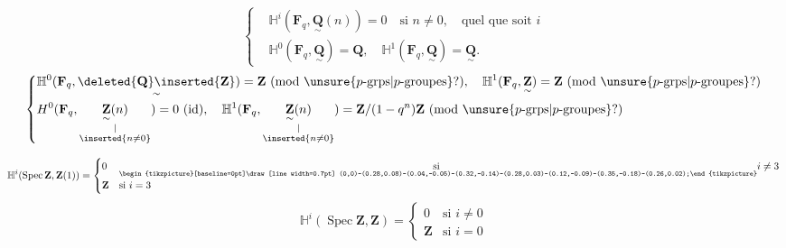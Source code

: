 \[
\left\{\begin{aligned}
&\mathbb H^i(\mathbf F_q,\underset{\sim}{\mathbf Q}(n))=0\quad\text{si }n\neq0,\quad\text{quel que soit }i\\
&\mathbb H^0(\mathbf F_q,\underset{\sim}{\mathbf Q})=\mathbf Q,\quad\mathbb H^1(\mathbf F_q,\underset{\sim}{\mathbf Q})=\underset{\sim}{\mathbf Q}.
\end{aligned}\right.
\]
\[
\left\{\begin{aligned}
&\mathbb H^0(\mathbf F_q,\underset{\sim}{\deleted{\mathbf Q}\inserted{\mathbf Z}})=\mathbf Z\ (\text{mod }\unsure{p\text{-grps}|p\text{-groupes}}?),\quad
\mathbb H^1(\mathbf F_q,\underset{\sim}{\mathbf Z})=\mathbf Z\ (\text{mod }\unsure{p\text{-grps}|p\text{-groupes}}?)\\
&H^0(\mathbf F_q,\underset{\substack{\vert\\\inserted{n\neq0}}}{\underset{\sim}{\mathbf Z}(n)})=0\ (\text{id}),\quad
\mathbb H^1(\mathbf F_q,\underset{\substack{\vert\\\inserted{n\neq0}}}{\underset{\sim}{\mathbf Z}(n)})=\mathbf Z/(1-q^n)\mathbf Z\ (\text{mod }\unsure{p\text{-grps}|p\text{-groupes}}?)
\end{aligned}\right.
\]


\[
\mathbb H^i(\operatorname{Spec}\mathbf Z,\mathbf Z(1))=\begin{cases}0&\underset{\text{\begin{tikzpicture}[baseline=0pt]\draw[line width=0.7pt] (0,0)--(0.28,0.08)--(0.04,-0.05)--(0.32,-0.14)--(0.28,0.03)--(0.12,-0.09)--(0.35,-0.18)--(0.26,0.02);\end{tikzpicture}}}{\text{si }}i\neq3\\\mathbf Z&\text{si }i=3\end{cases}
\]
\[
\mathbb H^i(\operatorname{Spec}\mathbf Z,\mathbf Z)=\begin{cases}0&\text{si }i\neq0\\\mathbf Z&\text{si }i=0\end{cases}
\]

